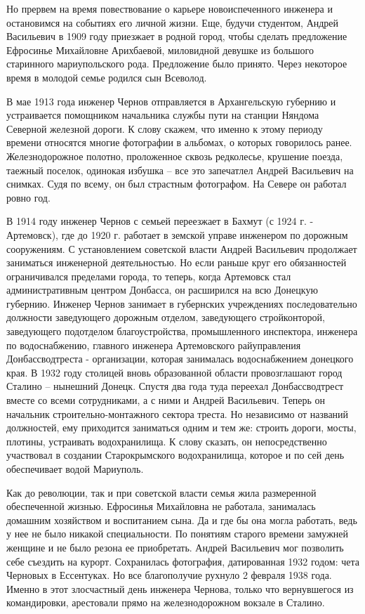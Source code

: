 Но прервем на время повествование о карьере новоиспеченного инженера и
остановимся на событиях его личной жизни. Еще, будучи студентом, Андрей
Васильевич в 1909 году приезжает в родной город, чтобы сделать предложение
Ефросинье Михайловне Арихбаевой, миловидной девушке из большого старинного
мариупольского рода. Предложение было принято. Через некоторое время в молодой
семье родился сын Всеволод.

В мае 1913 года инженер Чернов отправляется в Архангельскую губернию и
устраивается помощником начальника службы пути на станции Няндома Северной
железной дороги. К слову скажем, что именно к этому периоду времени относятся
многие фотографии в альбомах, о которых говорилось ранее. Железнодорожное
полотно, проложенное сквозь редколесье, крушение поезда, таежный поселок,
одинокая избушка – все это запечатлел Андрей Васильевич на снимках. Судя по
всему, он был страстным фотографом. На Севере он работал ровно год.

В 1914 году инженер Чернов с семьей переезжает в Бахмут (с 1924 г. -
Артемовск), где до 1920 г. работает в земской управе инженером по дорожным
сооружениям. С установлением советской власти Андрей Васильевич продолжает
заниматься инженерной деятельностью. Но если раньше круг его обязанностей
ограничивался пределами города, то теперь, когда Артемовск стал
административным центром Донбасса, он расширился на всю Донецкую губернию.
Инженер Чернов занимает в губернских учреждениях последовательно должности
заведующего дорожным отделом, заведующего стройконторой, заведующего подотделом
благоустройства, промышленного инспектора, инженера по водоснабжению, главного
инженера Артемовского райуправления Донбассводтреста - организации, которая
занималась водоснабжением донецкого края. В 1932 году столицей вновь
образованной области провозглашают город Сталино – нынешний Донецк. Спустя два
года туда переехал Донбассводтрест вместе со всеми сотрудниками, а с ними и
Андрей Васильевич. Теперь он начальник строительно-монтажного сектора треста.
Но независимо от названий должностей, ему приходится заниматься одним и тем же:
строить дороги, мосты, плотины, устраивать водохранилища. К слову сказать, он
непосредственно участвовал в создании Старокрымского водохранилища, которое и
по сей день обеспечивает водой Мариуполь.

Как до революции, так и при советской власти семья жила размеренной
обеспеченной жизнью. Ефросинья Михайловна не работала, занималась домашним
хозяйством и воспитанием сына. Да и где бы она могла работать, ведь у нее не
было никакой специальности. По понятиям старого времени замужней женщине и не
было резона ее приобретать. Андрей Васильевич мог позволить себе съездить на
курорт. Сохранилась фотография, датированная 1932 годом: чета Черновых в
Ессентуках. Но все благополучие рухнуло 2 февраля 1938 года. Именно в этот
злосчастный день инженера Чернова, только что вернувшегося из командировки,
арестовали прямо на железнодорожном вокзале в Сталино.

